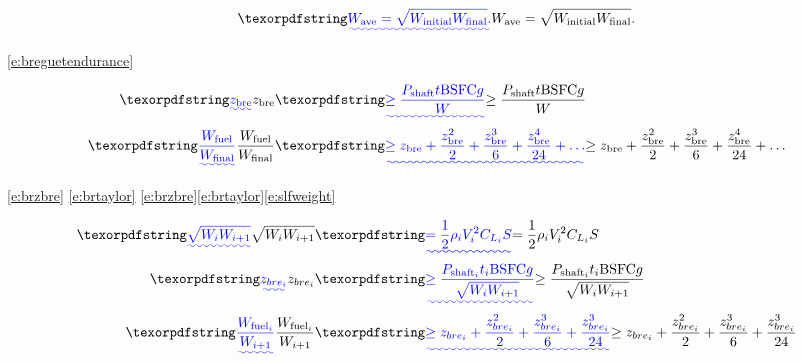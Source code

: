 
\begin{equation}
    \DIFadd{\label{e:gpmean}
    W_{\text{ave}} = \sqrt{W_{\text{initial}}W_{\text{final}}}.
}\end{equation}

    \eqref{e:breguetendurance} 

\begin{align}
    \DIFadd{\label{e:brzbre}
    z_{\text{bre}} }&\DIFadd{\geq \frac{P_{\text{shaft}}t \text{BSFC} g}{W}}\\
    \DIFadd{\label{e:brtaylor}
    \frac{W_{\text{fuel}}}{W_\text{final}} }&\DIFadd{\geq z_{\text{bre}} + \frac{z_{\text{bre}}^2}{2} + \frac{z_{\text{bre}}^3}{6} + \frac{z_{\text{bre}}^4}{24} + \dots
}\end{align}

    \eqref{e:brzbre} \eqref{e:brtaylor} \eqref{e:brzbre}\DIFadd{,~}\eqref{e:brtaylor}\eqref{e:slfweight} 

\begin{align}
    \DIFadd{\label{e:slfweightd}
    \sqrt{W_i W_{i+1}} }&\DIFadd{= \frac{1}{2} \rho_i V_i^2 C_{L_i} S }\\
    \DIFadd{\label{e:brzbred}
    z_{bre_i} }&\DIFadd{\geq \frac{P_{\text{shaft}_i}t_i \text{BSFC} g}{\sqrt{W_i W_{i+1}}}}\\
    \DIFadd{\label{e:brtaylord}
    \frac{W_{\text{fuel}_i}}{W_{i+1}} }&\DIFadd{\geq z_{bre_i} + \frac{z_{bre_i}^2}{2} + \frac{z_{bre_i}^3}{6} + \frac{z_{bre_i}^3}{24} 
    }\end{align}

